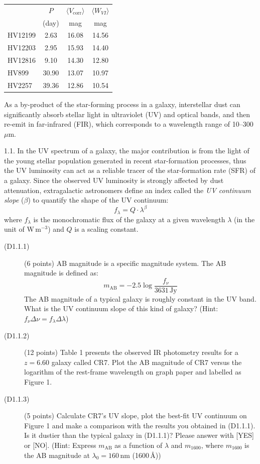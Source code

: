 \begin{center}
\begin{tabular}{l|c|c|c}
 & $P$ & $\langle V_{\mathrm{corr}}\rangle$ & $\langle W_{VI}\rangle$ \\
 & (day) & mag & mag \\
\hline
HV12199 & 2.63  & 16.08 & 14.56 \\
HV12203 & 2.95  & 15.93 & 14.40 \\
HV12816 & 9.10  & 14.30 & 12.80 \\
HV899   & 30.90 & 13.07 & 10.97 \\
HV2257  & 39.36 & 12.86 & 10.54 \\
\end{tabular}
\end{center}

As a by-product of the star-forming process in a galaxy, interstellar dust can
significantly absorb stellar light in ultraviolet (UV) and optical bands, and
then re-emit in far-infrared (FIR), which corresponds to a wavelength range of
10--300\,$\mu$m.

1.1. In the UV spectrum of a galaxy, the major contribution is from the light
of the young stellar population generated in recent star-formation processes,
thus the UV luminosity can act as a reliable tracer of the star-formation rate
(SFR) of a galaxy. Since the observed UV luminosity is strongly affected by
dust attenuation, extragalactic astronomers define an index called the
\emph{UV continuum slope} ($\beta$) to quantify the shape of the UV continuum:
\[ f_\lambda = Q \cdot \lambda^\beta \]
where $f_\lambda$ is the monochromatic flux of the galaxy at a given
wavelength $\lambda$ (in the unit of W\,m$^{-3}$) and $Q$ is a scaling
constant.

\begin{description}
\item[(D1.1.1)] (6 points) AB magnitude is a specific magnitude system. The AB
  magnitude is defined as:
  \[ m_{\mathrm{AB}} = -2.5 \log \frac{f_\nu}{3631\,\mathrm{Jy}} \]
  The AB magnitude of a typical galaxy is roughly constant in the UV band.
  What is the UV continuum slope of this kind of galaxy? (Hint:
  $f_\nu \Delta\nu = f_\lambda \Delta\lambda$)
\item[(D1.1.2)] (12 points) Table 1 presents the observed IR photometry
  results for a $z = 6.60$ galaxy called CR7. Plot the AB magnitude of CR7
  versus the logarithm of the rest-frame wavelength on graph paper and
  labelled as Figure 1.
\item[(D1.1.3)] (5 points) Calculate CR7's UV slope, plot the best-fit UV
  continuum on Figure 1 and make a comparison with the results you obtained in
  (D1.1.1). Is it dustier than the typical galaxy in (D1.1.1)? Please answer
  with [YES] or [NO]. (Hint: Express $m_{\mathrm{AB}}$ as a function of
  $\lambda$ and $m_{1600}$, where $m_{1600}$ is the AB magnitude at
  $\lambda_0 = 160$\,nm (1600\,\AA))
\end{description}

